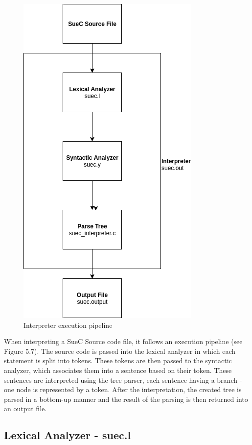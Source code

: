 \documentclass[12pt,a4paper,twoside]{report}
\begin{document}
\begin{figure}[H]
    \centering
    \includegraphics[width=0.6\linewidth]{img/InterpreterPipeline.png}
    \caption{Interpreter execution pipeline}
    \label{fig:conf}
\end{figure}

When interpreting a SueC Source code file, it follows an execution pipeline (see Figure 5.7). The source code is passed into the lexical analyzer in which each statement is split into tokens. These tokens are then passed to the syntactic analyzer, which associates them into a sentence based on their token. These sentences are interpreted using the tree parser, each sentence having a branch - one node is represented by a token. After the interpretation, the created tree is parsed in a bottom-up manner and the result of the parsing is then returned into an output file. 

\subsection{Lexical Analyzer - suec.l}
\end{document}
